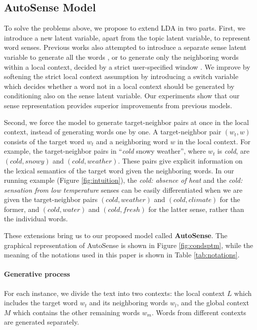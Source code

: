 \documentclass[letterpaper]{article} %
\begin{document}
\subsection{AutoSense Model}

To solve the problems above, we propose to extend LDA in two parts. First, we introduce a new latent variable, apart from the topic latent variable, to represent word senses. Previous works also attempted to introduce a separate sense latent variable to generate all the words \cite{chang2014inducing}, or to generate only the neighboring words within a local context, decided by a strict user-specified window \cite{wang2015sense}. We improve by softening the strict local context assumption by introducing a switch variable which decides whether a word not in a local context should be generated by conditioning also on the sense latent variable. Our experiments show that our sense representation provides superior improvements from previous models.

Second, we force the model to generate target-neighbor pairs at once in the local context, instead of generating words one by one. A target-neighbor pair $(w_t, w)$ consists of the target word $w_t$ and a neighboring word $w$ in the local context. For example, the target-neighbor pairs in ``\textit{cold} snowy weather'', where $w_t$ is \textit{cold}, are $(cold,snowy)$ and $(cold,weather)$. These pairs give explicit information on the lexical semantics of the target word given the neighboring words. In our running example (Figure \ref{fig:intuition}), the \textit{cold: absence of heat} and the \textit{cold: sensation from low temperature} senses can be easily differentiated when we are given the target-neighbor pairs $(cold,weather)$ and $(cold,climate)$ for the former, and $(cold,water)$ and $(cold,fresh)$ for the latter sense, rather than the individual words.

These extensions bring us to our proposed model called \textbf{AutoSense}. The graphical representation of AutoSense is shown in Figure \ref{fig:condsptm}, while the meaning of the notations used in this paper is shown in Table \ref{tab:notations}.

\paragraph{Generative process}

For each instance, we divide the text into two contexts: the local context $L$ which includes the target word $w_t$ and its neighboring words $w_l$, and the global context $M$ which contains the other remaining words $w_m$. Words from different contexts are generated separately.
\end{document}
